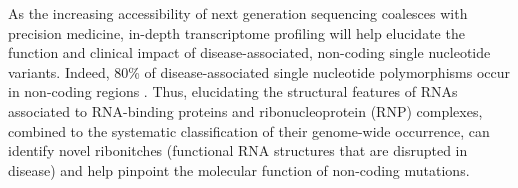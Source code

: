 \documentclass[a4paper,11pt]{article}
\begin{document}
%

As the increasing accessibility of next generation sequencing coalesces with precision medicine, 
in-depth transcriptome profiling will help elucidate the function and clinical impact of disease-associated,
non-coding single nucleotide variants. 
Indeed, 80\% of disease-associated single nucleotide polymorphisms occur in non-coding regions 
\cite{hindorff2009potential,ritchie2014functional}. Thus, elucidating the structural features of RNAs associated to RNA-binding proteins and ribonucleoprotein (RNP) complexes, combined to the systematic classification of their genome-wide occurrence, 
can identify novel ribonitches (functional RNA structures that are disrupted in disease) 
and help pinpoint the molecular function of non-coding mutations. \\

%
\end{document}
